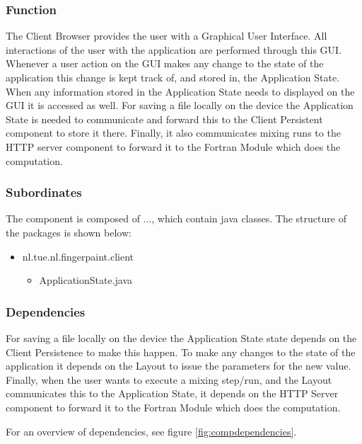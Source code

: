 \subsubsection*{Function}
The Client Browser provides the user with a Graphical User Interface. All interactions of the user with the application are performed through this GUI. Whenever a user action on the GUI makes any change to the state of the application this change is kept track of, and stored in, the Application State. When any information stored in the Application State needs to displayed on the GUI it is accessed as well. For saving a file locally on the device the Application State is needed to communicate and forward this to the Client Persistent component to store it there. Finally, it also communicates mixing runs to the HTTP server component to forward it to the Fortran Module which does the computation.

\subsubsection*{Subordinates}
The component is composed of ..., which contain java classes. The structure of the packages is shown below:

\fpstartparagraph{} \begin{itemize}
	\item nl.tue.nl.fingerpaint.client
	\begin{itemize}
		\item ApplicationState.java
	\end{itemize}
\end{itemize}

\subsubsection*{Dependencies}
For saving a file locally on the device the Application State state depends on the Client Persistence to make this happen. To make any changes to the state of the application it depends on the Layout to issue the parameters for the new value. Finally, when the user wants to execute a mixing step/run, and the Layout communicates this to the Application State, it depends on the HTTP Server component to forward it to the Fortran Module which does the computation.

\fpstartparagraph{} For an overview of dependencies, see figure \ref{fig:compdependencies}.

